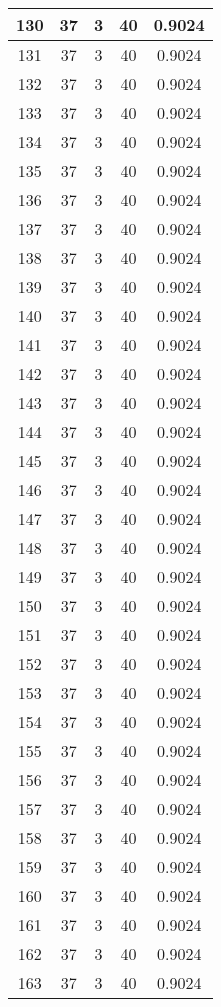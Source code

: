 \documentclass[letterpaper, 12pt]{article}
\begin{document}
\begin{longtable}{|c|c|c|c|c|}
\hline
130 & 37 & 3 & 40 & 0.9024 \\
\hline
131 & 37 & 3 & 40 & 0.9024 \\
\hline
132 & 37 & 3 & 40 & 0.9024 \\
\hline
133 & 37 & 3 & 40 & 0.9024 \\
\hline
134 & 37 & 3 & 40 & 0.9024 \\
\hline
135 & 37 & 3 & 40 & 0.9024 \\
\hline
136 & 37 & 3 & 40 & 0.9024 \\
\hline
137 & 37 & 3 & 40 & 0.9024 \\
\hline
138 & 37 & 3 & 40 & 0.9024 \\
\hline
139 & 37 & 3 & 40 & 0.9024 \\
\hline
140 & 37 & 3 & 40 & 0.9024 \\
\hline
141 & 37 & 3 & 40 & 0.9024 \\
\hline
142 & 37 & 3 & 40 & 0.9024 \\
\hline
143 & 37 & 3 & 40 & 0.9024 \\
\hline
144 & 37 & 3 & 40 & 0.9024 \\
\hline
145 & 37 & 3 & 40 & 0.9024 \\
\hline
146 & 37 & 3 & 40 & 0.9024 \\
\hline
147 & 37 & 3 & 40 & 0.9024 \\
\hline
148 & 37 & 3 & 40 & 0.9024 \\
\hline
149 & 37 & 3 & 40 & 0.9024 \\
\hline
150 & 37 & 3 & 40 & 0.9024 \\
\hline
151 & 37 & 3 & 40 & 0.9024 \\
\hline
152 & 37 & 3 & 40 & 0.9024 \\
\hline
153 & 37 & 3 & 40 & 0.9024 \\
\hline
154 & 37 & 3 & 40 & 0.9024 \\
\hline
155 & 37 & 3 & 40 & 0.9024 \\
\hline
156 & 37 & 3 & 40 & 0.9024 \\
\hline
157 & 37 & 3 & 40 & 0.9024 \\
\hline
158 & 37 & 3 & 40 & 0.9024 \\
\hline
159 & 37 & 3 & 40 & 0.9024 \\
\hline
160 & 37 & 3 & 40 & 0.9024 \\
\hline
161 & 37 & 3 & 40 & 0.9024 \\
\hline
162 & 37 & 3 & 40 & 0.9024 \\
\hline
163 & 37 & 3 & 40 & 0.9024 \\

\end{longtable}
\end{document}
